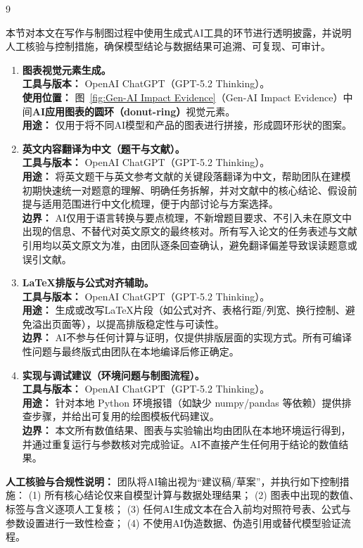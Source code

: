 \documentclass{mcmthesis}
\begin{document}
\begin{ReportAiUse}{9}

本节对本文在写作与制图过程中使用生成式AI工具的环节进行透明披露，并说明人工核验与控制措施，确保模型结论与数据结果可追溯、可复现、可审计。

\begin{enumerate}
\item \textbf{图表视觉元素生成。}\\
\textbf{工具与版本：} OpenAI ChatGPT（GPT-5.2 Thinking）。\\
\textbf{使用位置：} 图~\ref{fig:Gen-AI Impact Evidence}（Gen-AI Impact Evidence）中间\textbf{AI应用图表的圆环（donut-ring）}视觉元素。\\
\textbf{用途：} 仅用于将不同AI模型和产品的图表进行拼接，形成圆环形状的图案。\\


\item \textbf{英文内容翻译为中文（题干与文献）。}\\
\textbf{工具与版本：} OpenAI ChatGPT（GPT-5.2 Thinking）。\\
\textbf{用途：} 将英文题干与英文参考文献的关键段落翻译为中文，帮助团队在建模初期快速统一对题意的理解、明确任务拆解，并对文献中的核心结论、假设前提与适用范围进行中文化梳理，便于内部讨论与方案选择。\\
\textbf{边界：} AI仅用于语言转换与要点梳理，不新增题目要求、不引入未在原文中出现的信息、不替代对英文原文的最终核对。所有写入论文的任务表述与文献引用均以英文原文为准，由团队逐条回查确认，避免翻译偏差导致误读题意或误引文献。

\item \textbf{\LaTeX 排版与公式对齐辅助。}\\
\textbf{工具与版本：} OpenAI ChatGPT（GPT-5.2 Thinking）。\\
\textbf{用途：} 生成或改写\LaTeX 片段（如公式对齐、表格行距/列宽、换行控制、避免溢出页面等），以提高排版稳定性与可读性。\\
\textbf{边界：} AI不参与任何计算与证明，仅提供排版层面的实现方式。所有可编译性问题与最终版式由团队在本地编译后修正确定。

\item \textbf{实现与调试建议（环境问题与制图流程）。}\\
\textbf{工具与版本：} OpenAI ChatGPT（GPT-5.2 Thinking）。\\
\textbf{用途：} 针对本地 Python 环境报错（如缺少 numpy/pandas 等依赖）提供排查步骤，并给出可复用的绘图模板代码建议。\\
\textbf{边界：} 本文所有数值结果、图表与实验输出均由团队在本地环境运行得到，并通过重复运行与参数核对完成验证。AI不直接产生任何用于结论的数值结果。

\end{enumerate}

\noindent \textbf{人工核验与合规性说明：}
团队将AI输出视为“建议稿/草案”，并执行如下控制措施：
(1) 所有核心结论仅来自模型计算与数据处理结果；
(2) 图表中出现的数值、标签与含义逐项人工复核；
(3) 任何AI生成文本在合入前均对照符号表、公式与参数设置进行一致性检查；
(4) 不使用AI伪造数据、伪造引用或替代模型验证流程。

\end{ReportAiUse}
\end{document}
